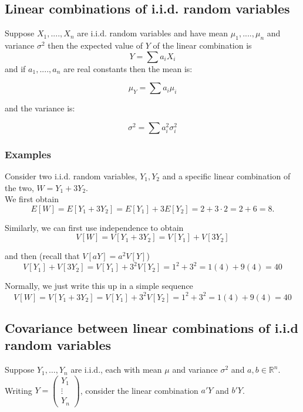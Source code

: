 \documentclass[12pt,a4paper]{article}
\theoremstyle{regla}
\theoremstyle{remark}
\theoremstyle{definition}
\theoremstyle{nonumberbreak}
\begin{document}
\subsection{Linear combinations of i.i.d. random variables}
\begin{fbox}
\begin{minipage}{0.97\textwidth}
Suppose $X_1,....,X_n$ are i.i.d. random variables and have mean $\mu_1, ...., \mu_n$ and variance $\sigma^2$ 
then the expected value of $Y$ of the linear combination is 
$$Y=\sum a_i X_i$$
and if $a_1,....,a_n$ are real constants then the mean is:

$$\mu_Y = \sum a_i \mu_i$$

and the variance is:

$$\sigma^2 = \sum a^2_i \sigma^2_i$$
\end{minipage}
\end{fbox}
\subsubsection{Examples}
\begin{xmpl} 
Consider two i.i.d. random variables, 
$Y_1,Y_2$ 
and a specific  
linear combination of the two, 
$W=Y_1+3Y_2$.\\

We first obtain 
$$E[W]=E[Y_1+3Y_2]=E[Y_1]+3E[Y_2]=2+3\cdot 2=2+6=8.$$

Similarly, we 
can first use independence 
to obtain
$$V[W]=V[Y_1+3Y_2]=V[Y_1]+V[3Y_2]$$

and then (recall that $V[aY]=a^2V[Y]$)
$$V[Y_1]+V[3Y_2]=V[Y_1]+3^2V[Y_2]=1^2+3^2= 1(4) + 9(4)= 40$$

Normally, 
we just write this up in 
a simple sequence
$$V[W]=V[Y_1+3Y_2]=V[Y_1]+3^2V[Y_2]=1^2+3^2= 1(4) + 9(4)= 40$$
\end{xmpl}

\subsection{Covariance between linear combinations of i.i.d random variables}
\begin{fbox}
\begin{minipage}{0.97\textwidth}
Suppose $Y_1,\ldots,Y_n$ are i.i.d., each with mean $\mu$ and variance $\sigma^2$ and $a,b\in \mathbb{R}^n$.
Writing 
$
 Y= \left(
 \begin{array}{ccc}
   Y_1  \\
   \vdots\\
   Y_n 
 \end{array} \right)
$, consider the linear combination $a'Y$ and $b'Y$.
\end{minipage}
\end{fbox}
\end{document}
